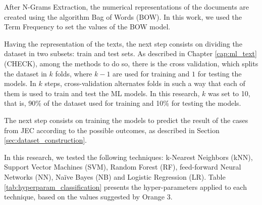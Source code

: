 After N-Grams Extraction, the numerical representations of the documents are created using the algorithm Bag of Words (BOW). In this work, we used the Term Frequency to set the values of the BOW model. 


Having the representation of the texts, the next step consists on dividing the dataset in two subsets: train and test sets. As described in Chapter \ref{cap:ml_text} (CHECK), among the methods to do so, there is the cross validation, which splits the dataset in $k$ folds, where $k-1$ are used for training and $1$ for testing the models. In $k$ steps, cross-validation alternates folds in such a way that each of them is used to train and test the ML models. In this research, $k$ was set to 10, that is, 90\% of the dataset used for training and 10\% for testing the models.

The next step consists on training the models to predict the result of the cases from JEC according to the possible outcomes, as described in Section \ref{sec:dataset_construction}. 

In this research, we tested the following techniques: k-Nearest Neighbors (kNN), Support Vector Machines (SVM), Random Forest (RF), feed-forward Neural Networks (NN), Naïve Bayes (NB) and Logistic Regression (LR). Table \ref{tab:hyperparam_classification} presents the hyper-parameters applied to each technique, based on the values suggested by Orange 3.


